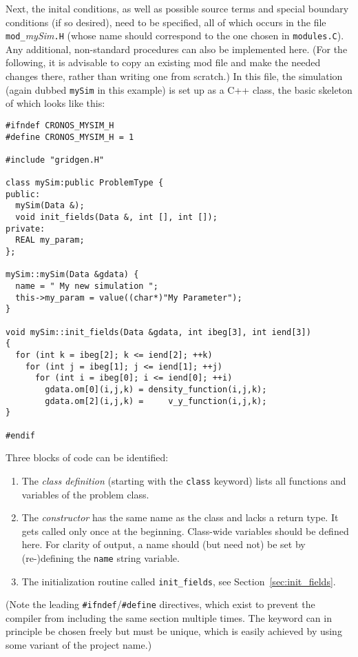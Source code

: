 Next, the inital conditions, as well as possible source terms and
special boundary conditions (if so desired), need to be specified, all
of which occurs in the file {\tt mod\_}{\it mySim}{\tt.H} (whose name
should correspond to the one chosen in {\tt modules.C}). Any
additional, non-standard procedures can also be implemented here. (For
the following, it is advisable to copy an existing mod file and make
the needed changes there, rather than writing one from scratch.)
In this file, the simulation (again dubbed {\tt mySim} in this
example) is set up as a C++ class, the basic skeleton of which looks
like this:\\
\begin{center}
\begin{verbatim}
#ifndef CRONOS_MYSIM_H
#define CRONOS_MYSIM_H = 1

#include "gridgen.H"

class mySim:public ProblemType {
public:
  mySim(Data &);
  void init_fields(Data &, int [], int []);
private:
  REAL my_param;
};

mySim::mySim(Data &gdata) {
  name = " My new simulation ";
  this->my_param = value((char*)"My Parameter");
}

void mySim::init_fields(Data &gdata, int ibeg[3], int iend[3])
{
  for (int k = ibeg[2]; k <= iend[2]; ++k)
    for (int j = ibeg[1]; j <= iend[1]; ++j)
      for (int i = ibeg[0]; i <= iend[0]; ++i)
        gdata.om[0](i,j,k) = density_function(i,j,k);
        gdata.om[2](i,j,k) =     v_y_function(i,j,k);
}

#endif
\end{verbatim}
\end{center}
Three blocks of code can be identified:
\begin{enumerate}
\item The {\em class definition} (starting with the {\tt class} keyword) lists
  all functions and variables of the problem class.
\item The {\em constructor} has the same name as the class and lacks a return
  type. It gets called only once at the beginning. Class-wide variables
  should be defined here. For clarity of output, a name should (but need not)
  be set by (re-)defining the {\tt name} string variable.
\item The initialization routine called {\tt init\_fields}, see
  Section~\ref{sec:init_fields}.
\end{enumerate}
(Note the leading \verb+#ifndef+/\verb+#define+ directives, which
exist to prevent the compiler from including the same section multiple
times. The keyword can in principle be chosen freely but must be
unique, which is easily achieved by using some variant of the project
name.)



